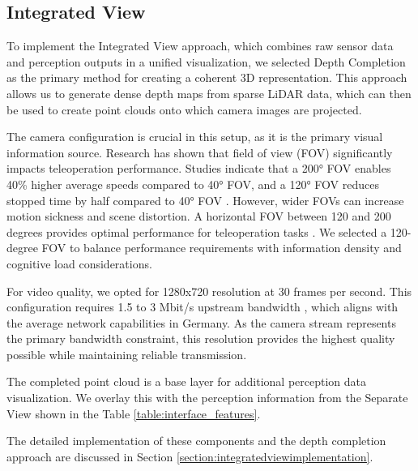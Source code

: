 \subsection{Integrated View}
To implement the Integrated View approach, which combines raw sensor data and perception outputs in a unified visualization, we selected Depth Completion as the primary method for creating a coherent 3D representation. This approach allows us to generate dense depth maps from sparse LiDAR data, which can then be used to create point clouds onto which camera images are projected.

The camera configuration is crucial in this setup, as it is the primary visual information source. Research has shown that field of view (FOV) significantly impacts teleoperation performance. Studies indicate that a 200° FOV enables 40\% higher average speeds compared to 40° FOV, and a 120° FOV reduces stopped time by half compared to 40° FOV \cite{fovConsiderations}. However, wider FOVs can increase motion sickness and scene distortion. A horizontal FOV between 120 and 200 degrees provides optimal performance for teleoperation tasks \cite{fovConsiderations}. We selected a 120-degree FOV to balance performance requirements with information density and cognitive load considerations.

For video quality, we opted for 1280x720 resolution at 30 frames per second. This configuration requires 1.5 to 3 Mbit/s upstream bandwidth \cite{vdocipher2024bandwidth}, which aligns with the average network capabilities in Germany. As the camera stream represents the primary bandwidth constraint, this resolution provides the highest quality possible while maintaining reliable transmission.

The completed point cloud is a base layer for additional perception data visualization. We overlay this with the perception information from the Separate View shown in the Table \ref{table:interface_features}.

The detailed implementation of these components and the depth completion approach are discussed in Section \ref{section:integratedviewimplementation}.

